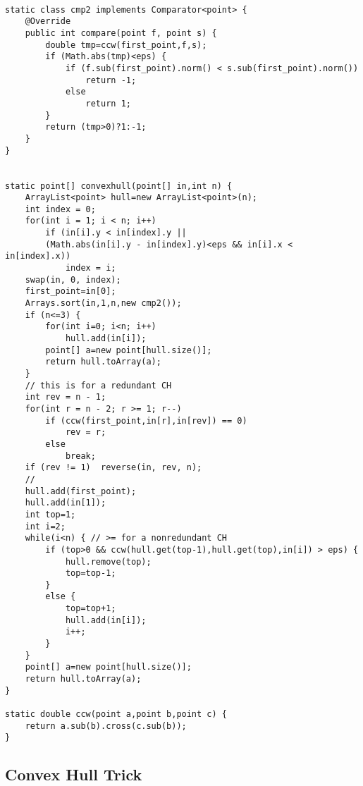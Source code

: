 \documentclass[10pt,letterpaper,twocolumn,twosided]{article}
\begin{document}
\begin{lstlisting}

static class cmp2 implements Comparator<point> {
    @Override
    public int compare(point f, point s) {
        double tmp=ccw(first_point,f,s);
        if (Math.abs(tmp)<eps) {
            if (f.sub(first_point).norm() < s.sub(first_point).norm())
                return -1;
            else
                return 1;
        }
        return (tmp>0)?1:-1;
    }
}


static point[] convexhull(point[] in,int n) {
    ArrayList<point> hull=new ArrayList<point>(n);
    int index = 0;
    for(int i = 1; i < n; i++)
        if (in[i].y < in[index].y || 
        (Math.abs(in[i].y - in[index].y)<eps && in[i].x < in[index].x))
            index = i;
    swap(in, 0, index);
    first_point=in[0];
    Arrays.sort(in,1,n,new cmp2());
    if (n<=3) {
        for(int i=0; i<n; i++)
            hull.add(in[i]);
        point[] a=new point[hull.size()];
        return hull.toArray(a);
    }
    // this is for a redundant CH
    int rev = n - 1;
    for(int r = n - 2; r >= 1; r--)
        if (ccw(first_point,in[r],in[rev]) == 0)
            rev = r;
        else
            break;
    if (rev != 1)  reverse(in, rev, n);
    //
    hull.add(first_point);
    hull.add(in[1]);
    int top=1;
    int i=2;
    while(i<n) { // >= for a nonredundant CH
        if (top>0 && ccw(hull.get(top-1),hull.get(top),in[i]) > eps) {
            hull.remove(top);
            top=top-1;
        }
        else {
            top=top+1;
            hull.add(in[i]);
            i++;
        }
    }
    point[] a=new point[hull.size()];
    return hull.toArray(a);
}

static double ccw(point a,point b,point c) {
    return a.sub(b).cross(c.sub(b));
}
\end{lstlisting}

\subsection{Convex Hull Trick}
\end{document}
